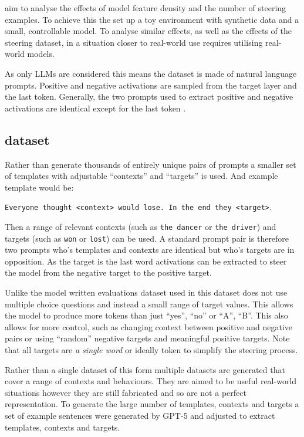 \citet{steering-clear} aim to analyse the effects of model feature density and the number of steering examples.
To achieve this the set up a toy environment with synthetic data and a small, controllable model.
To analyse similar effects, as well as the effects of the steering dataset, in a situation closer to real-world use requires utilising real-world models.

As only LLMs are considered this means the dataset is made of natural language prompts.
Positive and negative activations are sampled from the target layer and the last token.
Generally, the two prompts used to extract positive and negative activations are identical except for the last token \citep{steerability, icv, activation-addition}.

\subsection{dataset}

Rather than generate thousands of entirely unique pairs of prompts a smaller set of templates with adjustable ``contexts'' and ``targets'' is used.
And example template would be:

\texttt{Everyone thought <context> would lose. In the end they <target>}.

Then a range of relevant contexts (such as \texttt{the dancer} or \texttt{the driver}) and targets (such as \texttt{won} or \texttt{lost}) can be used.
A standard prompt pair is therefore two prompts who's templates and contexts are identical but who's targets are in opposition.
As the target is the last word activations can be extracted to steer the model from the negative target to the positive target.

Unlike the model written evaluations \citep{mwe} dataset used in \citet{steerability} this dataset does not use multiple choice questions and instead a small range of target values.
This allows the model to produce more tokens than just ``yes'', ``no'' or ``A'', ``B''.
This also allows for more control, such as changing context between positive and negative pairs or using ``random'' negative targets and meaningful positive targets.
Note that all targets are \emph{a single word} or ideally token to simplify the steering process.

Rather than a single dataset of this form multiple datasets are generated that cover a range of contexts and behaviours.
They are aimed to be useful real-world situations however they are still fabricated and so are not a perfect representation.
To generate the large number of templates, contexts and targets a set of example sentences were generated by GPT-5 \citep{gpt-5} and adjusted to extract templates, contexts and targets.

